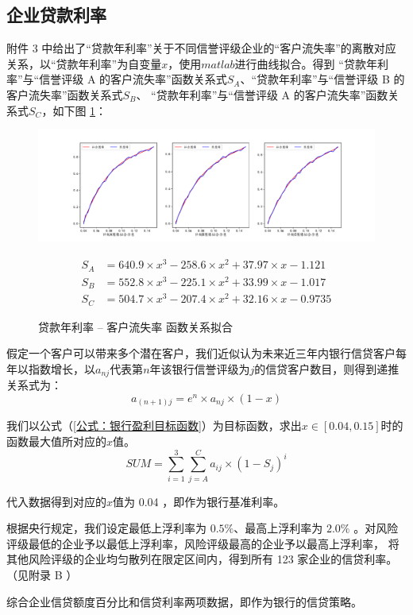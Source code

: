 \documentclass[withoutpreface,bwprint]{cumcmthesis}
\begin{document}
    \subsection{企业贷款利率}
        附件 3 中给出了``贷款年利率''关于不同信誉评级企业的``客户流失率''的离散对应关系，以``贷款年利率''为自变量$x$，使用$matlab$进行曲线拟合。得到
        ``贷款年利率''与``信誉评级 A 的客户流失率''函数关系式$S_A$、``贷款年利率''与``信誉评级 B 的客户流失率''函数关系式$S_B$、
        ``贷款年利率''与``信誉评级 A 的客户流失率''函数关系式$S_C$，如下图 \ref{图：贷款年利率 -- 客户流失率 函数关系拟合}：
        \begin{figure}[H]    
            \centering
            \includegraphics[width = 1.0\textwidth]{贷款年利率-客户流失率函数关系拟合.pdf}
            \caption{贷款年利率 -- 客户流失率 函数关系拟合}
            \label {图：贷款年利率 -- 客户流失率 函数关系拟合}
            \begin{align}
                S_A &= 640.9 \times x^3 - 258.6 \times x^2 + 37.97 \times x - 1.121 \\
                S_B &= 552.8 \times x^3 - 225.1 \times x^2 + 33.99 \times x - 1.017 \\
                S_C &= 504.7 \times x^3 - 207.4 \times x^2 + 32.16 \times x - 0.9735 
            \end{align}
        \end{figure}
        
        假定一个客户可以带来多个潜在客户，我们近似认为未来近三年内银行信贷客户每年以指数增长，以$a_{nj}$代表第$n$年该银行信誉评级为$j$的信贷客户数目，则得到递推关系式为：
        \begin{equation}
            a_{(n + 1) j} = e^n \times a_{n j} \times (1 - x)
        \end{equation}\par
        我们以公式（\ref{公式：银行盈利目标函数}）为目标函数，求出$x \in[0.04, 0.15]$时的函数最大值所对应的$x$值。
        \begin{equation}
            SUM = {\sum_{i = 1}^{3} \sum_{j = A}^{C} a_{ij} \times (1 - S_j)^i}
            \label {公式：银行盈利目标函数}
        \end{equation}\par
        代入数据得到对应的$x$值为 0.04 ，即作为银行基准利率。 \par
        根据央行规定，我们设定最低上浮利率为 $0.5 \%$、最高上浮利率为 $2.0 \%$ 。对风险评级最低的企业予以最低上浮利率，风险评级最高的企业予以最高上浮利率，
        将其他风险评级的企业均匀散列在限定区间内，得到所有 123 家企业的信贷利率。（见附录 B ）\par
        综合企业信贷额度百分比和信贷利率两项数据，即作为银行的信贷策略。
\end{document}
